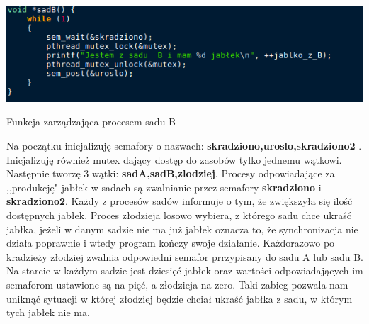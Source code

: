 \documentclass{article}
\begin{document}
\begin{center}
\includegraphics[width=\textwidth]{sadB} 
\caption{Funkcja zarządzająca procesem sadu B}
\end{center}

Na początku inicjalizuję semafory o nazwach:\textbf{ skradziono,uroslo,skradziono2 }. Inicjalizuję również mutex dający dostęp do zasobów  tylko jednemu wątkowi. Następnie tworzę 3 wątki: \textbf{sadA,sadB,zlodziej}. Procesy odpowiadające za ,,produkcję" jabłek w sadach są zwalnianie przez semafory \textbf{skradziono} i \textbf{skradziono2}. Każdy z procesów sadów informuje o tym, że zwiększyła się ilość dostępnych jabłek. Proces złodzieja losowo wybiera, z którego sadu chce ukraść jabłka, jeżeli w danym sadzie nie ma już jabłek oznacza to, że synchronizacja nie działa poprawnie i wtedy program kończy swoje działanie. Każdorazowo po kradzieży złodziej zwalnia odpowiedni semafor prrzypisany do sadu A lub sadu B. Na starcie w każdym sadzie jest dziesięć jabłek oraz wartości odpowiadających im semaforom ustawione są na pięć, a złodzieja na zero. Taki zabieg pozwala nam uniknąć sytuacji w której złodziej będzie chciał ukraść jabłka z sadu, w którym tych jabłek nie ma.
\end{document}
